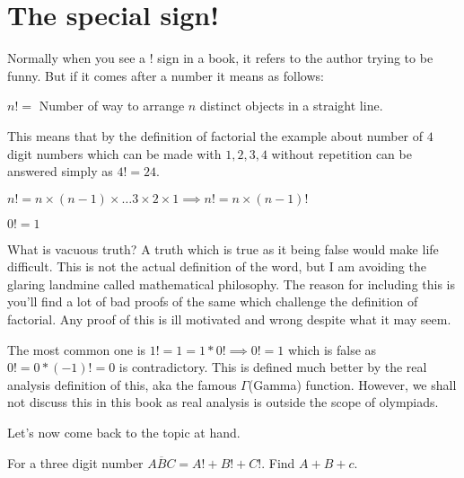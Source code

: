 \section{The special sign!}
Normally when you see a ! sign in a book, it refers to the author trying to be funny. 
But if it comes after a number it means as follows:
\begin{definition}
    [Factorial]
    $n!=$ Number of way to arrange $n$ distinct objects in a straight line.
\end{definition}
This means that by the definition of factorial the example about number of $4$ digit numbers which can be made with $1,2,3,4$ without repetition can be answered simply as $4!=24$.\par
\begin{theorem}
    $n!=n\times (n-1)\times \dots 3\times 2 \times 1 \implies n!=n \times (n-1)!$
\end{theorem}
\begin{theorem}
    $0!=1$
\end{theorem}
What is vacuous truth? A truth which is true as it being false would make life difficult. 
This is not the actual definition of the word, but I am avoiding the glaring landmine called 
mathematical philosophy. The reason for including this is you'll find a lot of bad proofs of 
the same which challenge the definition of factorial. Any proof of this is ill motivated and 
wrong despite what it may seem.\par
The most common one is $1!=1=1*0! \implies 0!=1$ which is false as $0!=0*(-1)!=0$ is contradictory. 
This is defined much better by the real analysis definition of this, aka the famous $\Gamma$(Gamma) function. 
However, we shall not discuss this in this book as real analysis is outside the scope of
olympiads.\par
Let's now come back to the topic at hand.
\begin{example}
For a three digit number $\overline{ABC} = A!+B!+C!$. Find $A+B+c$.
\end{example}

